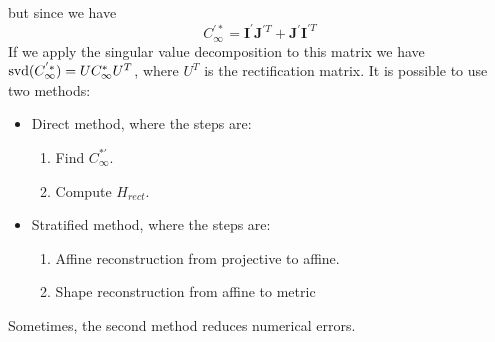 \documentclass[12pt, a4paper]{report}
\begin{document}
\begin{itemize}
\begin{enumerate}
                    but since we have 
                    \[C_{\infty}^{'*}=\boldsymbol{I}^{'}\boldsymbol{J}^{'T}+\boldsymbol{J}^{'}\boldsymbol{I}^{'T}\]
                    If we apply the singular value decomposition to this matrix we have $\textnormal{svd}(C_{\infty}^{'*})=UC_{\infty}^{*}U^T$, where 
                    $U^T$ is the rectification matrix. It is possible to use two methods: 
                    \begin{itemize}
                        \item Direct method, where the steps are: 
                            \begin{enumerate}
                                \item Find $C_{\infty}^{*'}$. 
                                \item Compute $H_{rect}$. 
                            \end{enumerate}
                        \item Stratified method, where the steps are: 
                            \begin{enumerate}
                                \item Affine reconstruction from projective to affine. 
                                \item Shape reconstruction from affine to metric
                            \end{enumerate}
                    \end{itemize}
                    Sometimes, the second method reduces numerical errors. 
            \end{enumerate}
    \end{itemize}
\end{document}
